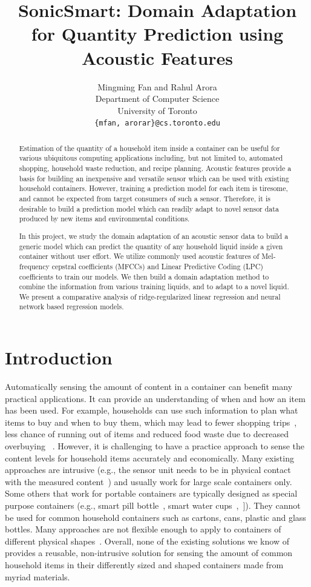 \documentclass{article} %
\title{SonicSmart: Domain Adaptation for Quantity Prediction using Acoustic Features}
\author{
Mingming Fan and Rahul Arora\\
Department of Computer Science\\
University of Toronto\\
\texttt{\{mfan, arorar\}@cs.toronto.edu}
}
\begin{document}
\maketitle

\begin{abstract}
Estimation of the quantity of a household item inside a container can be useful for various ubiquitous computing applications including, but not limited to, automated shopping, household waste reduction, and recipe planning.
Acoustic features provide a basis for building an inexpensive and versatile sensor which can be used with existing household containers.
However, training a prediction model for each item is tiresome, and cannot be expected from target consumers of such a sensor.
Therefore, it is desirable to build a prediction model which can readily adapt to novel sensor data produced by new items and environmental conditions.

In this project, we study the domain adaptation of an acoustic sensor data to build a generic model which can predict the quantity of any household liquid inside a given container without user effort.
We utilize commonly used acoustic features of Mel-frequency cepstral coefficients (MFCCs) and Linear Predictive Coding (LPC) coefficients to train our models.
We then build a domain adaptation method to combine the information from various training liquids, and to adapt to a novel liquid.
We present a comparative analysis of ridge-regularized linear regression and neural network based regression models.
\end{abstract}

\section{Introduction}
Automatically sensing the amount of content in a container can benefit many practical applications. It can provide an understanding of when and how an item has been used. For example, households can use such information to plan what items to buy and when to buy them, which may lead to fewer shopping trips~\cite{fram1990distressed}, less chance of running out of items and reduced food waste due to decreased overbuying ~\cite{ganglbauer2012creating}. However, it is challenging to have a practice approach to sense the content levels for household items accurately and economically. Many existing approaches are intrusive (e.g., the sensor unit needs to be in physical contact with the measured content~\cite{canbolat2009novel}) and usually work for large scale containers only. Some others that work for portable containers are typically designed as special purpose containers (e.g., smart pill bottle~\cite{adheretech}, smart water cups~\cite{cuptime},~\cite{vessyl}]). They cannot be used for common household containers such as cartons, cans, plastic and glass bottles. Many approaches are not flexible enough to apply to containers of different physical shapes~\cite{dietz2002wireless}. Overall, none of the existing solutions we know of provides a reusable, non-intrusive solution for sensing the amount of common household items in their differently sized and shaped containers made from myriad materials.
\end{document}
